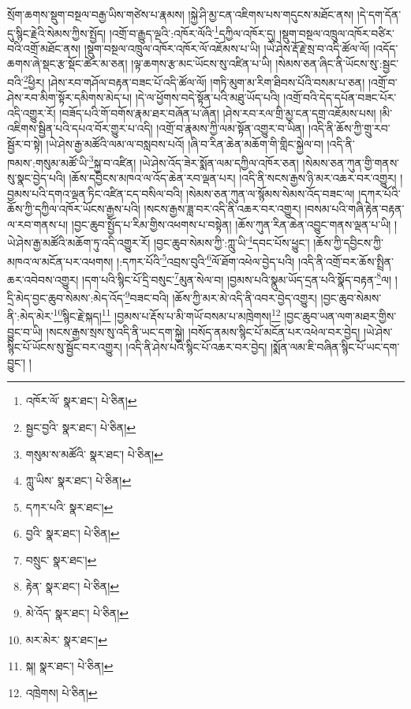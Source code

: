 སྲོག་ཆགས་སྡུག་བསྔལ་བརྒྱ་ཡིས་གཙེས་པ་རྣམས། །སྐྱེ་ཤི་མྱ་ངན་འཇིགས་པས་གདུངས་མཐོང་ནས། །དེ་དག་དོན་དུ་སྙིང་རྗེའི་སེམས་ཀྱིས་སྤྱོད། །འགྲོ་བ་རྒྱུད་ལྔའི་:འཁོར་ལོའི་\footnote{འཁོར་ལོ་  སྣར་ཐང་།  པེ་ཅིན། }དཀྱིལ་འཁོར་དུ། །སྡུག་བསྔལ་འཁྲུལ་འཁོར་བཙིར་བའི་འགྲོ་མཐོང་ནས། །སྡུག་བསྔལ་འཁྲུལ་འཁོར་འཁོར་ལོ་འཇོམས་པ་ཡི། །ཡེ་ཤེས་རྡོ་རྗེ་སྲ་བ་འདི་ཚོལ་ལོ། །འདོད་ཆགས་ཞེ་སྡང་རྩ་སྡོང་ཚེར་མ་ཅན། །ལྟ་ཆགས་རྩ་མང་ཡོངས་སུ་འཛིན་པ་ཡི། །སེམས་ཅན་ཞིང་ནི་ཡོངས་སུ་:སྦྱང་བའི་\footnote{སྦྱང་བྱའི་  སྣར་ཐང་།  པེ་ཅིན། }ཕྱིར། །ཤེས་རབ་གཤོལ་བརྟན་བཟང་པོ་འདི་ཚོལ་ལོ། །གཏི་མུག་མ་རིག་ཐིབས་པོའི་བསམ་པ་ཅན། །འགྲོ་བ་ཤེས་རབ་མིག་སྟོར་དམིགས་མེད་པ། །དེ་ལ་ཕྱོགས་བདེ་སྟོན་པའི་མཐུ་ཡོད་པའི། །འགྲོ་བའི་དེད་དཔོན་བཟང་པོར་འདི་འགྱུར་རོ། །བཟོད་པའི་གོ་བགོས་རྣམ་ཐར་བཞོན་པ་ཞོན། །ཤེས་རབ་རལ་གྲི་མྱ་ངན་དགྲ་འཇོམས་པས། །མི་འཇིགས་སྦྱིན་པའི་དཔའ་བོར་གྱུར་པ་འདི། །འགྲོ་བ་རྣམས་ཀྱི་ལམ་སྟོན་འགྱུར་བ་ཡིན། །འདི་ནི་ཆོས་ཀྱི་གྲུ་རབ་སྦྱོར་བ་སྟེ། །ཡེ་ཤེས་རྒྱ་མཚོའི་ལམ་ལ་བསླབས་པའོ། །ཞི་བ་རིན་ཆེན་མཆོག་གི་གླིང་སྐྱེལ་བ། །འདི་ནི་ཁམས་:གསུམ་མཚོ་ཡི་\footnote{གསུམ་ས་མཚོའི་  སྣར་ཐང་།  པེ་ཅིན། }སྐྱ་བ་འཛིན། །ཡེ་ཤེས་འོད་ཟེར་སྨོན་ལམ་དཀྱིལ་འཁོར་ཅན། །སེམས་ཅན་ཀུན་གྱི་གནས་སུ་སྣང་བྱེད་པའི། །ཆོས་དབྱིངས་མཁའ་ལ་འོད་ཆེན་རབ་ལྡན་པར། །འདི་ནི་སངས་རྒྱས་ཉི་མར་འཆར་བར་འགྱུར། །བྱམས་པའི་དགའ་ལྡན་ཏིང་འཛིན་ངད་བསིལ་བའི། །སེམས་ཅན་ཀུན་ལ་སྙོམས་སེམས་འོད་བཟང་ལ། །དཀར་པོའི་ཆོས་ཀྱི་དཀྱིལ་འཁོར་ཡོངས་རྒྱས་པའི། །སངས་རྒྱས་ཟླ་བར་འདི་ནི་འཆར་བར་འགྱུར། །བསམ་པའི་གཞི་རྟེན་བརྟན་ལ་རབ་གནས་པ། །བྱང་ཆུབ་སྤྱོད་པ་རིམ་གྱིས་འཕགས་པ་བསྟེན། །ཆོས་ཀུན་རིན་ཆེན་འབྱུང་གནས་ལྡན་པ་ཡི། །ཡེ་ཤེས་རྒྱ་མཚོའི་མཆོག་ཏུ་འདི་འགྱུར་རོ། །བྱང་ཆུབ་སེམས་ཀྱི་:ཀླུ་ཡི་\footnote{ཀླུ་ཡིས་  སྣར་ཐང་།  པེ་ཅིན། }དབང་པོས་ཕྱུང་། །ཆོས་ཀྱི་དབྱིངས་ཀྱི་མཁའ་ལ་མངོན་པར་འཕགས། །:དཀར་པོའི་\footnote{དཀར་པའི་  སྣར་ཐང་། }འབྲས་བུའི་\footnote{བྱའི་  སྣར་ཐང་།  པེ་ཅིན། }ལོ་ཐོག་འཕེལ་བྱེད་པའི། །འདི་ནི་འགྲོ་བར་ཆོས་སྤྲིན་ཆར་འབེབས་འགྱུར། །དག་པའི་སྙིང་པོ་དྲི་བསུང་\footnote{བསྲུང་  སྣར་ཐང་། }མུན་སེལ་བ། །བྱམས་པའི་སྣུམ་ཡོད་དྲན་པའི་སྣོད་བརྟན་\footnote{རྟེན་  སྣར་ཐང་།  པེ་ཅིན། }ལ། །དྲི་མེད་བྱང་ཆུབ་སེམས་:མེད་འོད་\footnote{མེ་འོད་  སྣར་ཐང་།  པེ་ཅིན། }བཟང་བའི། །ཆོས་ཀྱི་མར་མེ་འདི་ནི་འབར་བྱེད་འགྱུར། །བྱང་ཆུབ་སེམས་ནི་:མེད་མེར་\footnote{མར་མེར་  སྣར་ཐང་། }སྙིང་རྗེ་སྐད།\footnote{སྐ།  སྣར་ཐང་།  པེ་ཅིན། } །བྱམས་པ་རྡོས་པ་མི་གཡོ་བསམ་པ་མཁྲེགས།\footnote{འཁྲེགས།  པེ་ཅིན། } །བྱང་ཆུབ་ཡན་ལག་མཐར་གྱིས་བྱུང་བ་ཡི། །སངས་རྒྱས་སྲས་སུ་འདི་ནི་ཡང་དག་སྐྱེ། །བསོད་ནམས་སྙིང་པོ་མངོན་པར་འཕེལ་བར་བྱེད། །ཡེ་ཤེས་སྙིང་པོ་ཡོངས་སུ་སྦྱོང་བར་འགྱུར། །འདི་ནི་ཤེས་པའི་སྙིང་པོ་འཆར་བར་བྱེད། །སྨོན་ལམ་ཇི་བཞིན་སྙིང་པོ་ཡང་དག་བྱུང་། །
